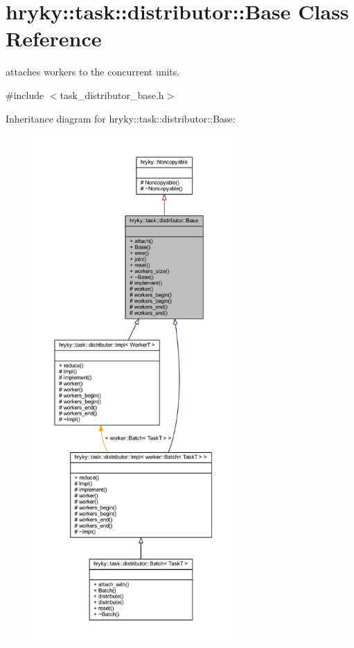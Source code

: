 \hypertarget{classhryky_1_1task_1_1distributor_1_1_base}{\section{hryky\-:\-:task\-:\-:distributor\-:\-:Base Class Reference}
\label{classhryky_1_1task_1_1distributor_1_1_base}
}


attaches workers to the concurrent units.  




{\ttfamily \#include $<$task\-\_\-distributor\-\_\-base.\-h$>$}



Inheritance diagram for hryky\-:\-:task\-:\-:distributor\-:\-:Base\-:
\nopagebreak
\begin{figure}[H]
\begin{center}
\leavevmode
\includegraphics[height=550pt]{classhryky_1_1task_1_1distributor_1_1_base__inherit__graph}
\end{center}
\end{figure}
